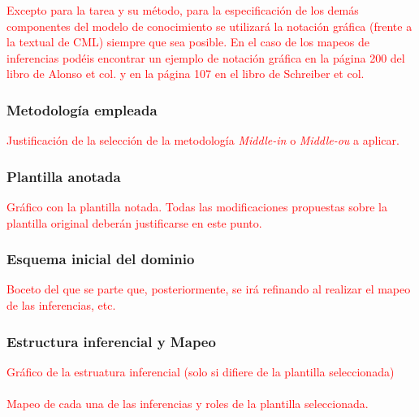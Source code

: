 \documentclass[12pt,a4paper,twoside,spanish]{article}      %
\begin{document}
\textcolor {red} {Excepto para la tarea y su método, para la especificación de los demás componentes del modelo de conocimiento se utilizará la notación gráfica (frente a la textual de CML) siempre que sea posible. En el caso de los mapeos de inferencias podéis encontrar un ejemplo de notación gráfica en la página 200 del libro de Alonso et col. y en la página 107 en el libro de Schreiber et col.}


\subsubsection{Metodología empleada}
\textcolor {red} {Justificación de la selección de la metodología \emph{Middle-in} o \emph{Middle-ou} a aplicar.}

\subsubsection{Plantilla anotada}

\textcolor {red} {Gráfico con la plantilla notada. Todas las modificaciones propuestas sobre la plantilla original deberán justificarse en este punto.}

\subsubsection{Esquema inicial del dominio}
\textcolor {red} {Boceto del que se parte que, posteriormente, se irá refinando al realizar el mapeo de las inferencias, etc.}

\subsubsection{Estructura inferencial y Mapeo}

\textcolor {red} {Gráfico de la estruatura inferencial (solo si difiere de la plantilla seleccionada) \\ \\ Mapeo de cada una de las inferencias y roles de la plantilla seleccionada.}
\end{document}
